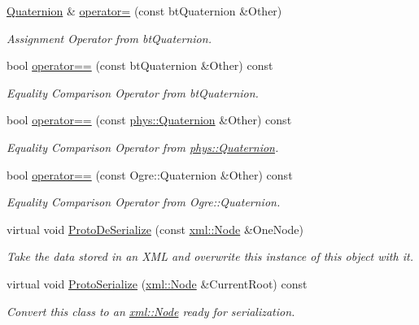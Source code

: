 \begin{DoxyCompactItemize}
\hyperlink{classphys_1_1Quaternion}{Quaternion} \& \hyperlink{classphys_1_1Quaternion_a05e7364791bf7f38ad63dc59184cd5ca}{operator=} (const btQuaternion \&Other)
\begin{DoxyCompactList}\small\item\em Assignment Operator from btQuaternion. \item\end{DoxyCompactList}\item 
bool \hyperlink{classphys_1_1Quaternion_a652ec257cb1ab788db646b85f3f89af3}{operator==} (const btQuaternion \&Other) const 
\begin{DoxyCompactList}\small\item\em Equality Comparison Operator from btQuaternion. \item\end{DoxyCompactList}\item 
bool \hyperlink{classphys_1_1Quaternion_aa02dc20b4246e16017b70788449d7012}{operator==} (const \hyperlink{classphys_1_1Quaternion}{phys::Quaternion} \&Other) const 
\begin{DoxyCompactList}\small\item\em Equality Comparison Operator from \hyperlink{classphys_1_1Quaternion}{phys::Quaternion}. \item\end{DoxyCompactList}\item 
bool \hyperlink{classphys_1_1Quaternion_a75ab11099a0479885ae5f42945621ef9}{operator==} (const Ogre::Quaternion \&Other) const 
\begin{DoxyCompactList}\small\item\em Equality Comparison Operator from Ogre::Quaternion. \item\end{DoxyCompactList}\item 
virtual void \hyperlink{classphys_1_1Quaternion_a71e3d4afb129ff822edbc700bae16b4b}{ProtoDeSerialize} (const \hyperlink{classphys_1_1xml_1_1Node}{xml::Node} \&OneNode)
\begin{DoxyCompactList}\small\item\em Take the data stored in an XML and overwrite this instance of this object with it. \item\end{DoxyCompactList}\item 
virtual void \hyperlink{classphys_1_1Quaternion_ab71a780a5103681126d04fec42cdcb2e}{ProtoSerialize} (\hyperlink{classphys_1_1xml_1_1Node}{xml::Node} \&CurrentRoot) const 
\begin{DoxyCompactList}\small\item\em Convert this class to an \hyperlink{classphys_1_1xml_1_1Node}{xml::Node} ready for serialization. \item\end{DoxyCompactList}\item 

\end{DoxyCompactItemize}
